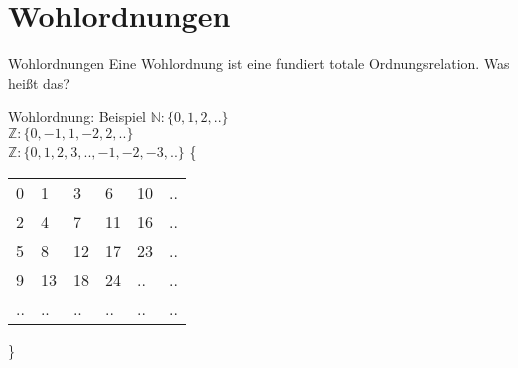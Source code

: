 \section{Wohlordnungen}


\begin{frame}[c]{Wohlordnungen}
    \Large
    Eine Wohlordnung ist eine fundiert totale Ordnungsrelation.
    \newline
    \bigskip
    \pause
    Was heißt das?
\end{frame}


\begin{frame}[c]{Wohlordnung: Beispiel}
    \Large
    $\mathbb{N}: \{0, 1, 2, .. \}$ \\
    \pause
    $\mathbb{Z}: \{0, -1, 1, -2, 2,..\}$  \\
    \pause
    $\mathbb{Z}: \{0, 1, 2, 3,.., -1, -2, -3,.. \}$ \newline
    \newline
    \newline
    \pause
    \{
    \normalsize
    \begin{tabular}{|llllll}
        \hline
        0 & 1 & 3 & 6 & 10 & ..\\
        2 & 4 & 7 & 11 & 16 & .. \\
        5 & 8 & 12 & 17 & 23 & .. \\
        9 & 13 & 18 & 24 & .. & .. \\
        .. & .. & .. & .. & .. & ..
    \end{tabular}
    \Large
    \}
\end{frame}

